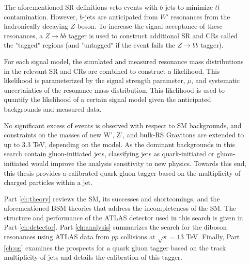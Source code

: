 The aforementioned SR definitions veto events with $b$-jets to minimize $t\bar{t}$ contamination. However, $b$-jets are anticipated from $W'$ resonances from the hadronically decaying $Z$ boson. To increase the signal acceptance of these resonances, a $Z\rightarrow bb$ tagger is used to construct additional SR and CRs called the "tagged" regions (and "untagged" if the event fails the $Z\rightarrow bb$ tagger). 

For each signal model, the simulated and measured resonance mass distributions in the relevant SR and CRs are combined to construct a likelihood. This likelihood is parameterized by the signal strength parameter, $\mu$, and systematic uncertainties of the resonance mass distribution. This likelihood is used to quantify the likelihood of a certain signal model given the anticipated backgrounds and measured data.

No significant excess of events is observed with respect to SM backgrounds, and constraints on the masses of new W', Z', and bulk-RS Gravitons are extended to up to 3.3 TeV, depending on the model. As the dominant backgrounds in this search contain gluon-initiated jets, classifying jets as quark-initiated or gluon-initiated would improve the analysis sensitivity to new physics. Towards this end, this thesis provides a calibrated quark-gluon tagger based on the multiplicity of charged particles within a jet.

Part \ref{ch:theory} reviews the SM, its successes and shortcomings, and the aforementioned BSM theories that address the incompleteness of the SM. The structure and performance of the ATLAS detector used in this search is given in Part \ref{ch:detector}. Part \ref{ch:analysis} summarizes the search for the diboson resonances using ATLAS data from $pp$ collisions at $\sqrt{s}=13$ TeV. Finally, Part \ref{ch:qg} examines the prospects for a quark gluon tagger based on the track multiplicity of jets and details the calibration of this tagger.